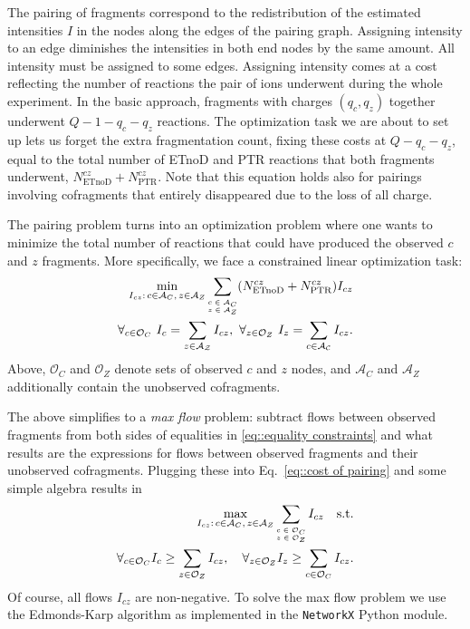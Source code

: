 \documentclass[journal=ancham, manuscript=article, layout=twocolumn]{achemso}
\begin{document}
The pairing of fragments correspond to the redistribution of the estimated intensities $I$ in the nodes along the edges of the pairing graph. 
Assigning intensity to an edge diminishes the intensities in both end nodes by the same amount. 
All intensity must be assigned to some edges. 
Assigning intensity comes at a cost reflecting the number of reactions the pair of ions underwent during the whole experiment.
In the basic approach, fragments with charges $(q_c, q_z)$ together underwent $Q - 1 - q_c - q_z$ reactions.
The optimization task we are about to set up lets us forget the extra fragmentation count, fixing these costs at $Q - q_c - q_z$, equal to the total number of ETnoD and PTR reactions that both fragments underwent, $N_\text{ETnoD}^{cz} + N_\text{PTR}^{cz}$. 
Note that this equation holds also for pairings involving cofragments that entirely disappeared due to the loss of all charge. 

The pairing problem turns into an optimization problem where one wants to minimize the total number of reactions that could have produced the observed $c$ and $z$ fragments.
More specifically, we face a constrained linear optimization task: 
\begin{align}
	\min_{ I_{cz}:\,c \in \mathcal{A}_C,\,z \in \mathcal{A}_Z }
	\sum_{ \mbox{\tiny$\begin{matrix} 
		c \in \mathcal{A}_C \\
		z \in \mathcal{A}_Z
	\end{matrix}$} } (N^{cz}_\text{ETnoD} + N^{cz}_\text{PTR}) I_{cz}\label{eq::cost of pairing} \\
	\forall_{c\in\mathcal{O}_C}\,\, I_c = \sum_{z\in\mathcal{A_Z}} I_{cz},\,\,\forall_{z\in\mathcal{O}_Z}\,\, I_z = \sum_{c\in \mathcal{A_C}} I_{cz}. \label{eq::equality constraints}
\end{align}
Above, $\mathcal{O}_C$ and $\mathcal{O}_Z$ denote sets of observed $c$ and $z$ nodes, and $\mathcal{A}_C$ and $\mathcal{A}_Z$ additionally contain the unobserved cofragments. 

The above simplifies to a \textit{max flow} problem: subtract flows between observed fragments from both sides of equalities in \eqref{eq::equality constraints} and what results are the expressions for flows between observed fragments and their unobserved cofragments. 
Plugging these into Eq.~\eqref{eq::cost of pairing} and some simple algebra results in
\begin{align*}
	\max_{ I_{cz}:\,c \in \mathcal{A}_C,\,z \in \mathcal{A}_Z } 
	\sum_{\mbox{\tiny$\begin{matrix} 
		c \in \mathcal{O}_C \\
		z \in \mathcal{O}_Z
	\end{matrix}$}} I_{cz} \quad\text{s.t.}\\
	\forall_{c\in\mathcal{O}_C} I_c \geq \sum_{z\in\mathcal{O}_Z} I_{cz},\quad \forall_{z\in\mathcal{O}_Z} I_z \geq \sum_{c\in\mathcal{O}_C} I_{cz}.
\end{align*}
Of course, all flows $I_{cz}$ are non-negative.
To solve the max flow problem we use the Edmonds-Karp algorithm\cite{edmonds1972theoretical} as implemented in the {\tt NetworkX} Python module\cite{hagberg-2008-exploring}.
\end{document}
